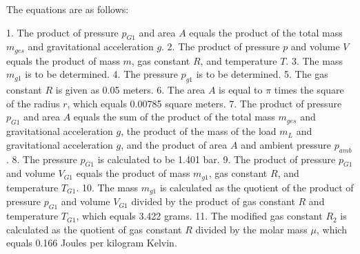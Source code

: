The equations are as follows:

1. The product of pressure \( p_{G1} \) and area \( A \) equals the product of the total mass \( m_{ges} \) and gravitational acceleration \( g \).
2. The product of pressure \( p \) and volume \( V \) equals the product of mass \( m \), gas constant \( R \), and temperature \( T \).
3. The mass \( m_{g1} \) is to be determined.
4. The pressure \( p_{g1} \) is to be determined.
5. The gas constant \( R \) is given as 0.05 meters.
6. The area \( A \) is equal to \( \pi \) times the square of the radius \( r \), which equals 0.00785 square meters.
7. The product of pressure \( p_{G1} \) and area \( A \) equals the sum of the product of the total mass \( m_{ges} \) and gravitational acceleration \( g \), the product of the mass of the load \( m_{L} \) and gravitational acceleration \( g \), and the product of area \( A \) and ambient pressure \( p_{amb} \).
8. The pressure \( p_{G1} \) is calculated to be 1.401 bar.
9. The product of pressure \( p_{G1} \) and volume \( V_{G1} \) equals the product of mass \( m_{g1} \), gas constant \( R \), and temperature \( T_{G1} \).
10. The mass \( m_{g1} \) is calculated as the quotient of the product of pressure \( p_{G1} \) and volume \( V_{G1} \) divided by the product of gas constant \( R \) and temperature \( T_{G1} \), which equals 3.422 grams.
11. The modified gas constant \( R_2 \) is calculated as the quotient of gas constant \( R \) divided by the molar mass \( \mu \), which equals 0.166 Joules per kilogram Kelvin.